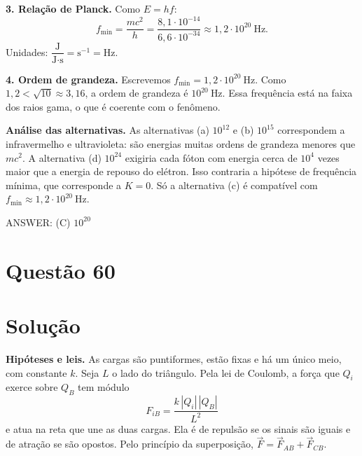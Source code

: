 \documentclass{article}%
\begin{document}
\textbf{3. Relação de Planck.} Como $E = hf$:
\[
f_{\min} = \frac{mc^2}{h} = \frac{8{,}1\cdot 10^{-14}}{6{,}6\cdot 10^{-34}} \approx 1{,}2\cdot 10^{20}\ \text{Hz}.
\]
Unidades: $\dfrac{\text{J}}{\text{J}\cdot\text{s}} = \text{s}^{-1} = \text{Hz}$.

\textbf{4. Ordem de grandeza.} Escrevemos $f_{\min} = 1{,}2\cdot 10^{20}\ \text{Hz}$. Como $1{,}2 < \sqrt{10} \approx 3{,}16$, a ordem de grandeza é $10^{20}\ \text{Hz}$. Essa frequência está na faixa dos raios gama, o que é coerente com o fenômeno.

\textbf{Análise das alternativas.} As alternativas (a) $10^{12}$ e (b) $10^{15}$ correspondem a infravermelho e ultravioleta: são energias muitas ordens de grandeza menores que $mc^2$. A alternativa (d) $10^{24}$ exigiria cada fóton com energia cerca de $10^4$ vezes maior que a energia de repouso do elétron. Isso contraria a hipótese de frequência mínima, que corresponde a $K = 0$. Só a alternativa (c) é compatível com $f_{\min} \approx 1{,}2\cdot 10^{20}\ \text{Hz}$.

ANSWER: (C) $10^{20}$%
\newpage%
\section*{Questão 60}

\section*{Solução}

\textbf{Hipóteses e leis.} As cargas são puntiformes, estão fixas e há um único meio, com constante $k$. Seja $L$ o lado do triângulo. Pela lei de Coulomb, a força que $Q_i$ exerce sobre $Q_B$ tem módulo
\[
F_{iB}=\frac{k\,|Q_i|\,|Q_B|}{L^2}
\]
e atua na reta que une as duas cargas. Ela é de repulsão se os sinais são iguais e de atração se são opostos. Pelo princípio da superposição, $\vec F=\vec F_{AB}+\vec F_{CB}$.

\begin{center}
\end{center}
\end{document}
